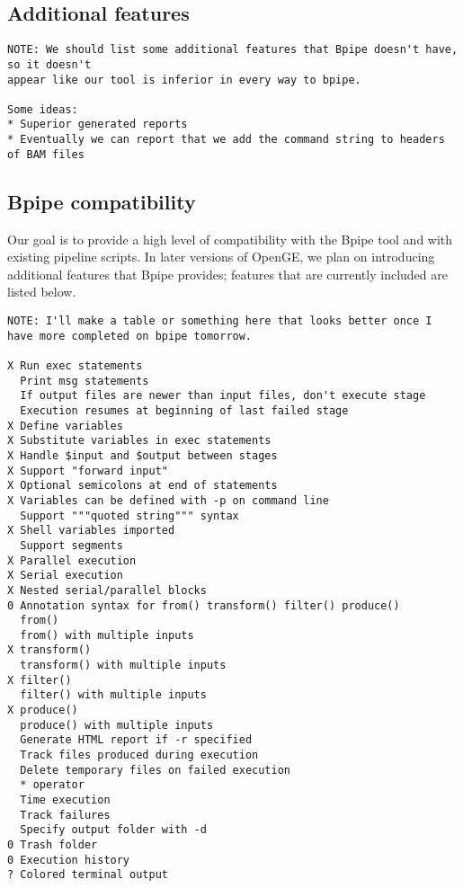 \documentclass[11pt]{article}
\begin{document}
\subsection {Additional features}
\begin{verbatim}
NOTE: We should list some additional features that Bpipe doesn't have, so it doesn't 
appear like our tool is inferior in every way to bpipe.

Some ideas:
* Superior generated reports
* Eventually we can report that we add the command string to headers of BAM files
\end{verbatim}

\subsection {Bpipe compatibility}
Our goal is to provide a high level of compatibility with the Bpipe tool and with existing pipeline scripts. In later versions of OpenGE, we plan on introducing additional features that Bpipe provides; features that are currently included are listed below.
\begin{verbatim}
NOTE: I'll make a table or something here that looks better once I 
have more completed on bpipe tomorrow.

X Run exec statements
  Print msg statements
  If output files are newer than input files, don't execute stage
  Execution resumes at beginning of last failed stage
X Define variables
X Substitute variables in exec statements
X Handle $input and $output between stages
X Support "forward input"
X Optional semicolons at end of statements
X Variables can be defined with -p on command line
  Support """quoted string""" syntax
X Shell variables imported
  Support segments
X Parallel execution
X Serial execution
X Nested serial/parallel blocks
0 Annotation syntax for from() transform() filter() produce()
  from()
  from() with multiple inputs
X transform()
  transform() with multiple inputs
X filter()
  filter() with multiple inputs
X produce()
  produce() with multiple inputs
  Generate HTML report if -r specified
  Track files produced during execution
  Delete temporary files on failed execution
  * operator
  Time execution
  Track failures
  Specify output folder with -d
0 Trash folder
0 Execution history
? Colored terminal output
\end{verbatim}
\end{document}
